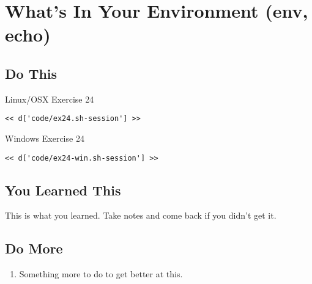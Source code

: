 \chapter{What's In Your Environment (env, echo)}

\section{Do This}

\begin{code}{Linux/OSX Exercise 24}
\begin{Verbatim}
<< d['code/ex24.sh-session'] >>
\end{Verbatim}
\end{code}

\begin{code}{Windows Exercise 24}
\begin{Verbatim}
<< d['code/ex24-win.sh-session'] >>
\end{Verbatim}
\end{code}

\section{You Learned This}

This is what you learned.  Take notes and come back if you didn't get it.

\section{Do More}

\begin{enumerate}
\item Something more to do to get better at this.
\end{enumerate}

